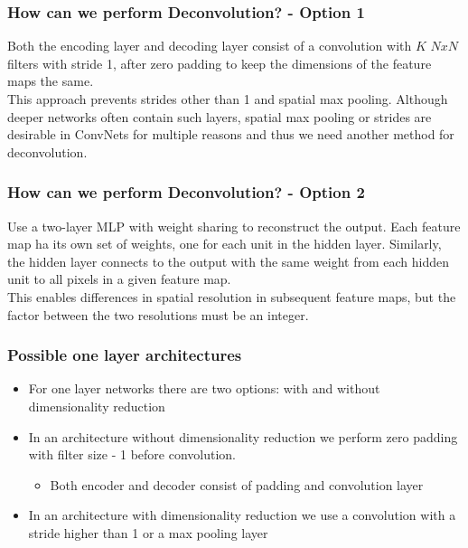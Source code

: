 \documentclass{beamer}
\begin{document}
\begin{frame}
\frametitle{How can we perform Deconvolution? - Option 1}
Both the encoding layer and decoding layer consist of a convolution with $K$ $NxN$ filters with stride 1, after zero padding to keep the dimensions of the feature maps the same. \\ \vspace{4mm}
This approach prevents strides other than 1 and spatial max pooling. Although deeper networks often contain such layers, spatial max pooling or strides are desirable in ConvNets for multiple reasons and thus we need another method for deconvolution.

\end{frame}

\begin{frame}
\frametitle{How can we perform Deconvolution? - Option 2}

Use a two-layer MLP with weight sharing to reconstruct the output. Each feature map ha its own set of weights, one for each unit in the hidden layer. Similarly, the hidden layer connects to the output with the same weight from each hidden unit to all pixels in a given feature map.
\\ \vspace{4mm}
This enables differences in spatial resolution in subsequent feature maps, but the factor between the two resolutions must be an integer.

\end{frame}

\begin{frame}
\frametitle{Possible one layer architectures}

\begin{itemize}
	\item For one layer networks there are two options: with and without dimensionality reduction
	\item In an architecture without dimensionality reduction we perform zero padding with filter size - 1 before convolution. 
		\begin{itemize}
			\item Both encoder and decoder consist of padding and convolution layer
		\end{itemize}
	\item In an architecture with dimensionality reduction we use a convolution with a stride higher than 1 or a max 
	pooling layer
\end{itemize}

\end{frame}
\end{document}
